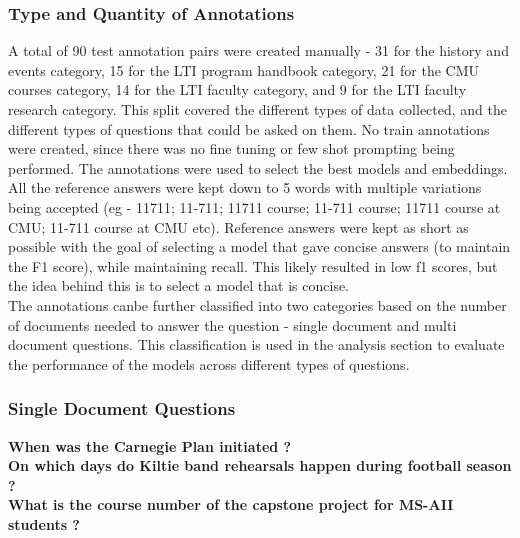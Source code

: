 \documentclass[11pt]{article}
\begin{document}
\subsubsection{Type and Quantity of Annotations}
A total of 90 test annotation pairs were created manually - 31 for the history and events category, 15 for the LTI program handbook category, 21 for the CMU courses category, 14 for the LTI faculty category, and 9 for the LTI faculty research category.
This split covered the different types of data collected, and the different types of questions that could be asked on them. No train annotations were created, since there was no fine tuning or few shot prompting being performed. The annotations were used to select the best models and embeddings.
All the reference answers were kept down to 5 words with multiple variations being accepted (eg - 11711; 11-711; 11711 course; 11-711 course; 11711 course at CMU; 11-711 course at CMU etc). Reference answers were kept as short as possible with the goal of selecting a model that gave concise answers (to maintain the F1 score), while maintaining recall.
This likely resulted in low f1 scores, but the idea behind this is to select a model that is concise.
\\The annotations canbe further classified into two categories based on the number of documents needed to answer the question - single document and multi document questions. This classification is used in the analysis section to evaluate the performance of the models across different types of questions.

\subsubsection{Single Document Questions}
\textbf{When was the Carnegie Plan initiated ?}
\\
\textbf{On which days do Kiltie band rehearsals happen during football season ?}
\\
\textbf{What is the course number of the capstone project for MS-AII students ?}
\end{document}

